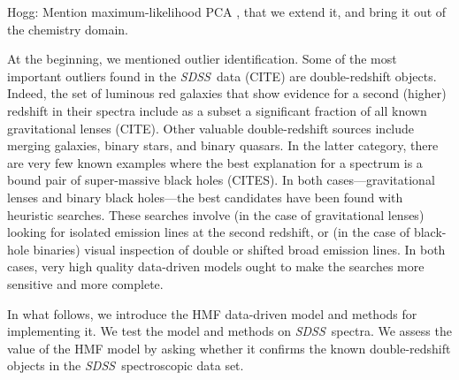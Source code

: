 \documentclass[12pt,preprint]{aastex}
\newcommand{\project}[1]{\textsl{#1}}
\newcommand{\sdss}{\project{SDSS}}
\begin{document}
Hogg: Mention maximum-likelihood PCA \citep{mlpca}, that we extend it,
and bring it out of the chemistry domain.

At the beginning, we mentioned outlier identification.  Some of the
most important outliers found in the \sdss\ data (CITE) are
double-redshift objects.  Indeed, the set of luminous red galaxies
that show evidence for a second (higher) redshift in their spectra
include as a subset a significant fraction of all known gravitational
lenses (CITE).  Other valuable double-redshift sources include merging
galaxies, binary stars, and binary quasars.  In the latter category,
there are very few known examples where the best explanation for a
spectrum is a bound pair of super-massive black holes (CITES).  In both
cases---gravitational lenses and binary black holes---the best
candidates have been found with heuristic searches.  These searches
involve (in the case of gravitational lenses) looking for isolated
emission lines at the second redshift, or (in the case of black-hole
binaries) visual inspection of double or shifted broad emission lines.
In both cases, very high quality data-driven models ought to make the
searches more sensitive and more complete.

In what follows, we introduce the HMF data-driven model and methods
for implementing it.  We test the model and methods on \sdss\ spectra.
We assess the value of the HMF model by asking whether it confirms the
known double-redshift objects in the \sdss\ spectroscopic data set.
\end{document}
